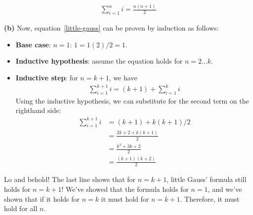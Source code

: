 \documentclass[a4paper, 11pt]{article}
\renewcommand{\part}[1] {\vspace{.10in} {\bf (#1)}}
\begin{document}
\begin{align}
\sum_{i=1}^n i = {\frac{n(n+1)}2}  %
\label{little-gauss}        %
\end{align}

\part{b} Now, equation~\ref{little-gauss} can be proven by induction as
follows:

\begin{itemize}
\item \textbf{Base case}: $n=1$: $1 = 1(2)/2=1$.
\item \textbf{Inductive hypothesis}: assume the equation holds for $n=2...k$.
\item \textbf{Inductive step}: for $n=k+1$, we have
\begin{align*}    %
\sum_{i=1}^{k+1} i = (k+1) + \sum_{i=1}^k i
\end{align*}
Using the inductive hypothesis, we can substitute for the second term
on the righthand side:
\begin{align*}
  \sum_{i=1}^{k+1} i &= (k+1) + k(k+1)/2\\    
                   &= {\frac{{2k+2 + k(k+1)}}2}\\
                   &= {\frac{{k^2 + 3k + 2}}2}\\
                   &= {\frac{(k+1)(k+2)}2}
\end{align*}
\end{itemize}

Lo and behold! The last line shows that for $n=k+1$, little Gauss'
formula still holds for $n=k+1$! We've showed that the formula holds
for $n=1$, and we've shown that if it holds for $n=k$ it must hold for
$n=k+1$. Therefore, it must hold for all $n$.
\end{document}
